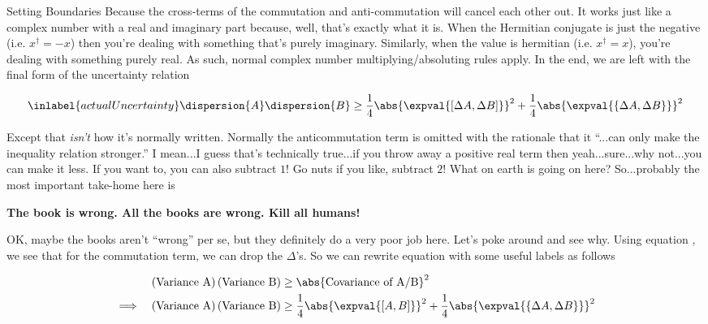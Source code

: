 \begin{answer}
\begin{answerpart}{Setting Boundaries}
    Because the cross-terms of the commutation and anti-commutation
    will cancel each other out.  It works just like a complex number
    with a real and imaginary part because, well, that's exactly what
    it is.  When the Hermitian conjugate is just the negative
    (i.e. $x^\dagger = -x$) then you're dealing with something that's
    purely imaginary.  Similarly, when the value is hermitian
    (i.e. $x^\dagger = x$), you're dealing with something purely real.
    As such, normal complex number multiplying/absoluting rules
    apply. In the end, we are left with the final form of the
    uncertainty relation

    \begin{equation}
      \inlabel{actualUncertainty}
      \dispersion{A}\dispersion{B}
      \ge
      \frac{1}{4} \abs{\expval{[\Delta A, \Delta B]}}^2
      + \frac{1}{4} \abs{\expval{\{\Delta A, \Delta B\}}}^2
    \end{equation}

    Except that \emph{isn't} how it's normally written.  Normally the
    anticommutation term is omitted with the rationale that it
    ``...can only make the inequality relation stronger.''  I mean...I
    guess that's technically true...if you throw away a positive real
    term then yeah...sure...why not...you can make it less.  If you
    want to, you can also subtract $1$!  Go nuts if you like, subtract
    $2$!  What on earth is going on here?  So...probably the most
    important take-home here is

    \begin{center}
      \textbf{\large{The book is wrong.  All the books are wrong.
          Kill all humans!}}
    \end{center}

    OK, maybe the books aren't ``wrong'' per se, but they definitely
    do a very poor job here.  Let's poke around and see why.  Using
    equation , we see that for the commutation
    term, we can drop the $\Delta$'s.  So we can rewrite equation
     with some useful labels as follows

    \begin{equation}
      \begin{alignedat}{2}
        & &
        \left(\text{Variance A}\right)
        \left(\text{Variance B}\right)
        &\ge
        \abs{\text{Covariance of A/B}}^2\\
        \implies\quad&&
        \left(\text{Variance A}\right)
        \left(\text{Variance B}\right)
        &\ge
        \frac{1}{4} \abs{\expval{[A, B]}}^2
        + \frac{1}{4} \abs{\expval{\{\Delta A, \Delta B\}}}^2
      \end{alignedat}
    \end{equation}


\end{answerpart}
\end{answer}
